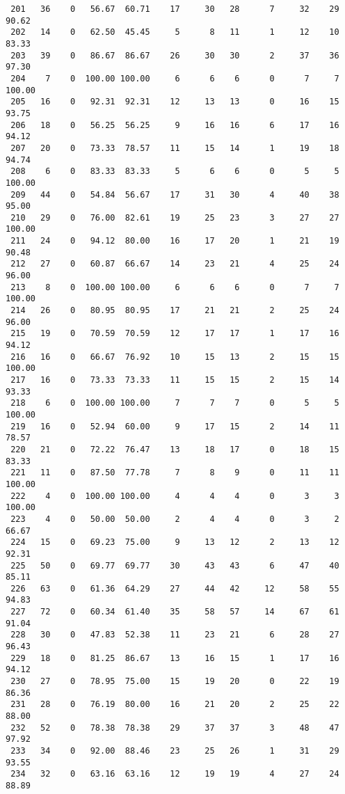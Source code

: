 \begin{verbatim}
 201   36    0   56.67  60.71    17     30   28      7     32    29    90.62
 202   14    0   62.50  45.45     5      8   11      1     12    10    83.33
 203   39    0   86.67  86.67    26     30   30      2     37    36    97.30
 204    7    0  100.00 100.00     6      6    6      0      7     7   100.00
 205   16    0   92.31  92.31    12     13   13      0     16    15    93.75
 206   18    0   56.25  56.25     9     16   16      6     17    16    94.12
 207   20    0   73.33  78.57    11     15   14      1     19    18    94.74
 208    6    0   83.33  83.33     5      6    6      0      5     5   100.00
 209   44    0   54.84  56.67    17     31   30      4     40    38    95.00
 210   29    0   76.00  82.61    19     25   23      3     27    27   100.00
 211   24    0   94.12  80.00    16     17   20      1     21    19    90.48
 212   27    0   60.87  66.67    14     23   21      4     25    24    96.00
 213    8    0  100.00 100.00     6      6    6      0      7     7   100.00
 214   26    0   80.95  80.95    17     21   21      2     25    24    96.00
 215   19    0   70.59  70.59    12     17   17      1     17    16    94.12
 216   16    0   66.67  76.92    10     15   13      2     15    15   100.00
 217   16    0   73.33  73.33    11     15   15      2     15    14    93.33
 218    6    0  100.00 100.00     7      7    7      0      5     5   100.00
 219   16    0   52.94  60.00     9     17   15      2     14    11    78.57
 220   21    0   72.22  76.47    13     18   17      0     18    15    83.33
 221   11    0   87.50  77.78     7      8    9      0     11    11   100.00
 222    4    0  100.00 100.00     4      4    4      0      3     3   100.00
 223    4    0   50.00  50.00     2      4    4      0      3     2    66.67
 224   15    0   69.23  75.00     9     13   12      2     13    12    92.31
 225   50    0   69.77  69.77    30     43   43      6     47    40    85.11
 226   63    0   61.36  64.29    27     44   42     12     58    55    94.83
 227   72    0   60.34  61.40    35     58   57     14     67    61    91.04
 228   30    0   47.83  52.38    11     23   21      6     28    27    96.43
 229   18    0   81.25  86.67    13     16   15      1     17    16    94.12
 230   27    0   78.95  75.00    15     19   20      0     22    19    86.36
 231   28    0   76.19  80.00    16     21   20      2     25    22    88.00
 232   52    0   78.38  78.38    29     37   37      3     48    47    97.92
 233   34    0   92.00  88.46    23     25   26      1     31    29    93.55
 234   32    0   63.16  63.16    12     19   19      4     27    24    88.89

\end{verbatim}
